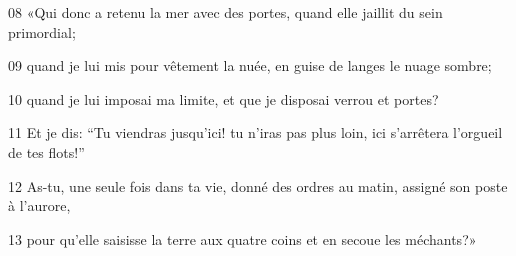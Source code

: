 
08 «Qui donc a retenu la mer avec des portes, quand elle jaillit du sein primordial;

09 quand je lui mis pour vêtement la nuée, en guise de langes le nuage sombre;

10 quand je lui imposai ma limite, et que je disposai verrou et portes?

11 Et je dis: “Tu viendras jusqu’ici! tu n’iras pas plus loin, ici s’arrêtera l’orgueil de tes flots!”

12 As-tu, une seule fois dans ta vie, donné des ordres au matin, assigné son poste à l’aurore,

13 pour qu’elle saisisse la terre aux quatre coins et en secoue les méchants?»
